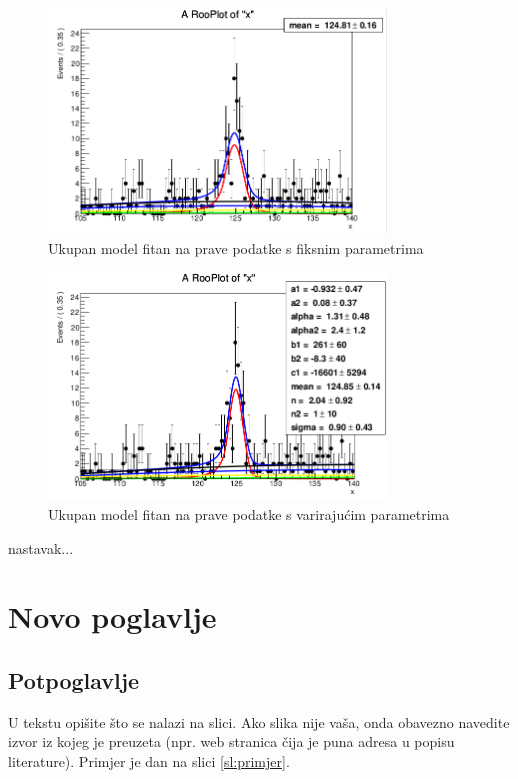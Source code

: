 \documentclass[12pt,a4paper,oneside]{article}
\begin{document}
\begin{linenumbers}
		\begin{figure}[h!]
			\centering
			\includegraphics[width=0.8\textwidth]{final-fit-fixed1.png}
			\caption[Saturn viđen u ultraljubičastom svjetlu.]{\label{sl:final-fit-fixed} Ukupan model fitan na prave podatke s fiksnim parametrima}
		\end{figure}
		
		\begin{figure}[h!]
			\centering
			\includegraphics[width=0.8\textwidth]{final-fit1.png}
			\caption[Saturn viđen u ultraljubičastom svjetlu.]{\label{sl:final-fit} Ukupan model fitan na prave podatke s varirajućim parametrima}
		\end{figure}
		 nastavak...
		
		\newpage
		\section{Novo poglavlje}
		\subsection{Potpoglavlje}
		U tekstu opišite što se nalazi na slici. Ako slika nije vaša, onda obavezno navedite  izvor iz kojeg je preuzeta (npr. web stranica čija je puna adresa u popisu literature). Primjer je dan na slici \ref{sl:primjer}. 
		

\end{linenumbers}
\end{document}
